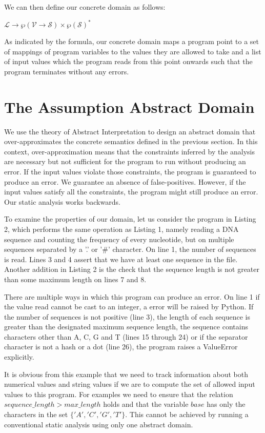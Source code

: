 \documentclass[10pt]{report}
\begin{document}
We can then define our concrete domain as follows: 
\begin{center}
$\mathcal{L} \rightarrow \wp(\mathcal{V} \rightarrow \mathcal{S}) \times \wp(\mathcal{S})^{*}$
\end{center}

As indicated by the formula, our  concrete domain maps a program point to a set of mappings of program variables to the values they are allowed to take and a list of input values which the program reads from this point onwards such that the program terminates without any errors. 

\section{The Assumption Abstract Domain} \label{assumption-domain}
We use the theory of Abstract Interpretation \cite{cousot} to design an abstract domain that over-approximates the concrete semantics defined in the previous section. In this context, over-approximation means that the constraints inferred by the analysis are necessary but not sufficient for the program to run without producing an error. If the input values violate those constraints, the program is guaranteed to produce an error. We guarantee an absence of false-positives. However, if the input values satisfy all the constraints, the program might still produce an error. Our static analysis works backwards. 

To examine the properties of our domain, let us consider the program in Listing 2, which performs the same operation as Listing 1, namely reading a DNA sequence and counting the frequency of every nucleotide, but on multiple sequences separated by a '.' or '\#' character. On line 1, the number of sequences is read. Lines 3 and 4 assert that we have at least one sequence in the file. Another addition in Listing 2 is the check that the sequence length is not greater than some maximum length on lines 7 and 8. 

There are multiple ways in which this program can produce an error. On line 1 if the value read cannot be cast to an integer, a error will be raised by Python. If the number of sequences is not positive (line 3), the length of each sequence is greater than the designated maximum sequence length, the sequence contains characters other than A, C, G and T (lines 15 through 24) or if the separator character is not a hash or a dot (line 26), the program raises a ValueError explicitly. 

It is obvious from this example that we need to track information about both numerical values and string values if we are to compute the set of allowed input values to this program. For examples we need to ensure that the relation $sequence\_length > max\_length$ holds and that the variable $base$ has only the characters in the set $\lbrace'A', 'C', 'G', 'T' \rbrace$. This cannot be achieved by running a conventional static analysis using only one abstract domain.
\end{document}
